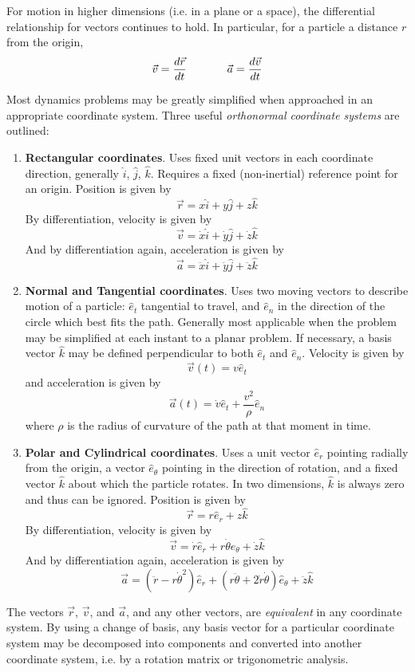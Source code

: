 For motion in higher dimensions (i.e. in a plane or a space), the differential relationship for vectors continues to hold. In particular, for a particle a distance $r$ from the origin, \[\vec{v} = \frac{d\vec{r}}{dt}\hspace{0.5in}\vec{a}=\frac{d\vec{v}}{dt}\] 

\newpage

Most dynamics problems may be greatly simplified when approached in an appropriate coordinate system. Three useful \textit{orthonormal coordinate systems} are outlined:

\vspace{-2em}
\begin{enumerate} %
    \item[] \textbf{Rectangular coordinates}. Uses fixed unit vectors in each coordinate direction, generally $\hat i$, $\hat j$, $\hat k$. Requires a fixed (non-inertial) reference point for an origin. Position is given by \[\vec{r} = x\hat i + y\hat j + z\hat k\] By differentiation, velocity is given by \[\vec{v} = \dot x \hat i + \dot y \hat j + \dot z \hat k\] And by differentiation again, acceleration is given by \[\vec{a} = \ddot x \hat i + \ddot y \hat j + \ddot z \hat k\]
    \item[] \textbf{Normal and Tangential coordinates}. Uses two moving vectors to describe motion of a particle: $\hat e_t$ tangential to travel, and $\hat e_n$ in the direction of the circle which best fits the path. Generally most applicable when the problem may be simplified at each instant to a planar problem. If necessary, a basis vector $\hat k$ may be defined perpendicular to both $\hat e_t$ and $\hat e_n$. Velocity is given by \[\vec{v}(t) = v\hat e_t\] and acceleration is given by \[\vec{a}(t) = \dot v \hat e_t + \frac{v^2}{\rho}\hat e_n\] where $\rho$ is the radius of curvature of the path at that moment in time.
    \item[] \textbf{Polar and Cylindrical coordinates}. Uses a unit vector $\hat e_r$ pointing radially from the origin, a vector $\hat e_\theta$ pointing in the direction of rotation, and a fixed vector $\hat k$ about which the particle rotates. In two dimensions, $\hat k$ is always zero and thus can be ignored. Position is given by \[\vec{r} = r\hat e_r + z\hat k\] By differentiation, velocity is given by \[\vec{v} = \dot r \hat e_r + r\dot\theta \hat e_\theta + \dot z \hat k\] And by differentiation again, acceleration is given by \[\vec{a} = (\ddot r - r\dot\theta^2)\hat e_r +(r\ddot\theta + 2 \dot r \dot \theta)\hat e_\theta + \ddot z \hat k\]
\end{enumerate}
The vectors $\vec{r}$, $\vec{v}$, and $\vec{a}$, and any other vectors, are \textit{equivalent} in any coordinate system. By using a change of basis, any basis vector for a particular coordinate system may be decomposed into components and converted into another coordinate system, i.e. by a rotation matrix or trigonometric analysis.


